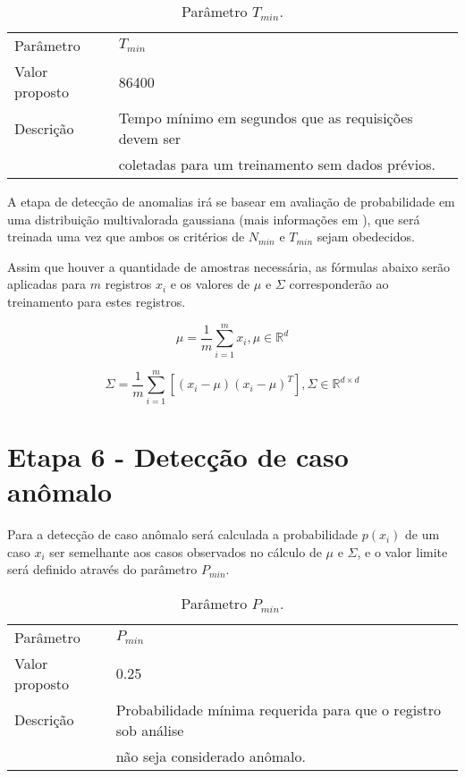 \begin{table}[H]
\caption{Parâmetro $T_{min}$.}
\vspace{0.25cm}
\begin{tabular}{ll}
Parâmetro      & $T_{min}$ \\
Valor proposto & 86400 \\
Descrição      & Tempo mínimo em segundos que as requisições devem ser \\
               & coletadas para um treinamento sem dados prévios.
\end{tabular}
\end{table}

A etapa de detecção de anomalias irá se basear em avaliação de probabilidade em uma
distribuição multivalorada gaussiana (mais informações em \citep{ng}), que será
treinada uma vez que ambos os critérios de $N_{min}$ e $T_{min}$ sejam obedecidos.

Assim que houver a quantidade de amostras necessária, as fórmulas abaixo serão
aplicadas para $m$ registros $x_i$ e os valores de $\mu$ e $\Sigma$ corresponderão ao
treinamento para estes registros.

\begingroup
\Large
\begin{equation}
\displaystyle \mu = \frac{1}{m} \sum_{i=1}^{m} x_i , \mu \in \mathbb{R}^d
\end{equation}
\endgroup

\begingroup
\Large
\begin{equation}
\displaystyle \Sigma = \frac{1}{m} \sum_{i=1}^{m} \left[ ( x_i - \mu ) ( x_i - \mu )^{T} \right] , \Sigma \in \mathbb{R}^{d \times d}
\end{equation}
\endgroup

\section{Etapa 6 - Detecção de caso anômalo}
\label{sec:etapa-6}

Para a detecção de caso anômalo será calculada a probabilidade $p(x_i)$ de um caso $x_i$
ser semelhante aos casos observados no cálculo de $\mu$ e $\Sigma$, e o valor limite será
definido através do parâmetro $P_{min}$.

\begin{table}[H]
\caption{Parâmetro $P_{min}$.}
\vspace{0.25cm}
\begin{tabular}{ll}
Parâmetro      & $P_{min}$ \\
Valor proposto & 0.25 \\
Descrição      & Probabilidade mínima requerida para que o registro sob análise \\
               & não seja considerado anômalo.
\end{tabular}
\end{table}

